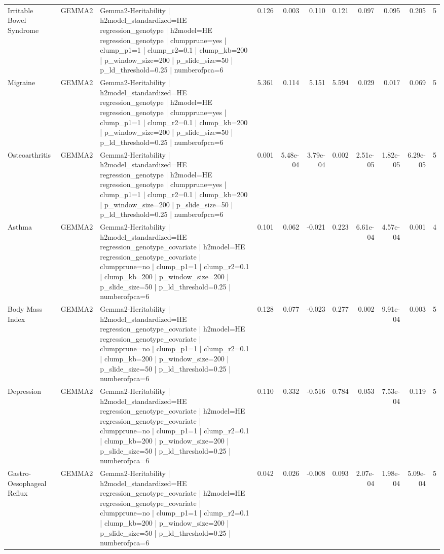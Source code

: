 \begin{landscape}
\begin{longtable}{p{2.4cm}p{1.8cm}p{6.0cm}rrrrrrrr}
Irritable Bowel Syndrome & GEMMA2 & Gemma2-Heritability | h2model\_standardized=HE regression\_genotype | h2model=HE regression\_genotype | clumpprune=yes | clump\_p1=1 | clump\_r2=0.1 | clump\_kb=200 | p\_window\_size=200 | p\_slide\_size=50 | p\_ld\_threshold=0.25 | numberofpca=6 & 0.126 & 0.003 & 0.110 & 0.121 & 0.097 & 0.095 & 0.205 & 5 \\
Migraine & GEMMA2 & Gemma2-Heritability | h2model\_standardized=HE regression\_genotype | h2model=HE regression\_genotype | clumpprune=yes | clump\_p1=1 | clump\_r2=0.1 | clump\_kb=200 | p\_window\_size=200 | p\_slide\_size=50 | p\_ld\_threshold=0.25 | numberofpca=6 & 5.361 & 0.114 & 5.151 & 5.594 & 0.029 & 0.017 & 0.069 & 5 \\
Osteoarthritis & GEMMA2 & Gemma2-Heritability | h2model\_standardized=HE regression\_genotype | h2model=HE regression\_genotype | clumpprune=yes | clump\_p1=1 | clump\_r2=0.1 | clump\_kb=200 | p\_window\_size=200 | p\_slide\_size=50 | p\_ld\_threshold=0.25 | numberofpca=6 & 0.001 & 5.48e-04 & 3.79e-04 & 0.002 & 2.51e-05 & 1.82e-05 & 6.29e-05 & 5 \\
Asthma & GEMMA2 & Gemma2-Heritability | h2model\_standardized=HE regression\_genotype\_covariate | h2model=HE regression\_genotype\_covariate | clumpprune=no | clump\_p1=1 | clump\_r2=0.1 | clump\_kb=200 | p\_window\_size=200 | p\_slide\_size=50 | p\_ld\_threshold=0.25 | numberofpca=6 & 0.101 & 0.062 & -0.021 & 0.223 & 6.61e-04 & 4.57e-04 & 0.001 & 4 \\
Body Mass Index & GEMMA2 & Gemma2-Heritability | h2model\_standardized=HE regression\_genotype\_covariate | h2model=HE regression\_genotype\_covariate | clumpprune=no | clump\_p1=1 | clump\_r2=0.1 | clump\_kb=200 | p\_window\_size=200 | p\_slide\_size=50 | p\_ld\_threshold=0.25 | numberofpca=6 & 0.128 & 0.077 & -0.023 & 0.277 & 0.002 & 9.91e-04 & 0.003 & 5 \\
Depression & GEMMA2 & Gemma2-Heritability | h2model\_standardized=HE regression\_genotype\_covariate | h2model=HE regression\_genotype\_covariate | clumpprune=no | clump\_p1=1 | clump\_r2=0.1 | clump\_kb=200 | p\_window\_size=200 | p\_slide\_size=50 | p\_ld\_threshold=0.25 | numberofpca=6 & 0.110 & 0.332 & -0.516 & 0.784 & 0.053 & 7.53e-04 & 0.119 & 5 \\
Gastro-Oesophageal Reflux & GEMMA2 & Gemma2-Heritability | h2model\_standardized=HE regression\_genotype\_covariate | h2model=HE regression\_genotype\_covariate | clumpprune=no | clump\_p1=1 | clump\_r2=0.1 | clump\_kb=200 | p\_window\_size=200 | p\_slide\_size=50 | p\_ld\_threshold=0.25 | numberofpca=6 & 0.042 & 0.026 & -0.008 & 0.093 & 2.07e-04 & 1.98e-04 & 5.09e-04 & 5 \\

\end{longtable}
\end{landscape}
